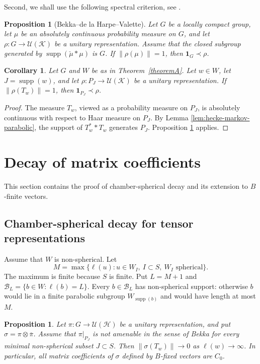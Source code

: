 \documentclass[12pt,a4paper]{amsproc}
\newtheorem{proposition}[theorem]{Proposition}
\newtheorem{corollary}[theorem]{Corollary}
\theoremstyle{definition}
\DeclareMathOperator{\supp}{supp}
\newcommand{\cH}{\mathcal H}
\newcommand{\cK}{\mathcal K}
\newcommand{\cU}{\mathcal U}
\newcommand{\one}{\mathbf 1}
\newcommand{\ol}[1]{\overline{#1}}
\newcommand{\norm}[1]{\left\lVert #1\right\rVert}
\newcommand{\weakcontain}{\prec}
\begin{document}
Second, we shall use the following spectral criterion, see \cite[Proposition G.4.2]{BHV}.

\begin{proposition}[Bekka--de la Harpe--Valette]\label{prop:BHV}
Let $G$ be a locally compact group, let $\mu$ be an absolutely continuous probability measure on $G$, and let $\rho:G\to\cU(\cK)$ be a   unitary representation. Assume that the closed subgroup generated by $\supp(\check\mu*\mu)$ is $G$. If $\norm{\rho(\mu)}=1$, then $\one_G\weakcontain \rho$.
\end{proposition}

\begin{corollary}\label{cor:norm-one-bekka}
Let $G$ and $W$ be as in Theorem~\ref{theoremA}. Let $w\in W$, let $J=\supp(w)$, and let $\rho:P_J\to\cU(\cK)$ be a   unitary representation. If $\norm{\rho(T_w)}=1$, then $\one_{P_J}\weakcontain \rho$.
\end{corollary}

\begin{proof}
The measure $T_w$, viewed as a probability measure on $P_J$, is absolutely continuous with respect to Haar measure on $P_J$. By Lemma \ref{lem:hecke-markov-parabolic}, the support of $T_w^**T_w$ generates $P_J$. Proposition \ref{prop:BHV} applies.
\end{proof}

\section{Decay of matrix coefficients}\label{sec:decay}

This section contains the proof of chamber-spherical decay and its extension to $B$-finite vectors.



\subsection{Chamber-spherical decay for tensor representations}
\label{sec:chamber-decay}

Assume that $W$ is non-spherical.  Let $$M=\max\{\ell(u):u\in W_I,\ I\subset S,\ W_I\text{ spherical}\}.$$ The maximum is finite because $S$ is finite. Put $L=M+1$ and $\mathcal B_L=\{b\in W:\ell(b)=L\}$. Every $b\in\mathcal B_L$ has non-spherical support: otherwise $b$ would lie in a finite parabolic subgroup $W_{\supp(b)}$ and would have length at most $M$.




\begin{proposition}\label{prop:tensor-hecke-decay}
Let $\pi \colon G\to\cU(\cH)$ be a   unitary representation, and put $\sigma=\pi\otimes\ol\pi$. Assume that $\pi|_{P_J}$ is not amenable in the sense of Bekka for every minimal non-spherical subset $J\subset S$. Then $\norm{\sigma(T_w)}\longrightarrow0$ as $\ell(w)\to\infty$. In particular, all matrix coefficients of $\sigma$ defined by $B$-fixed vectors are $C_0$.  
\end{proposition}
\end{document}
